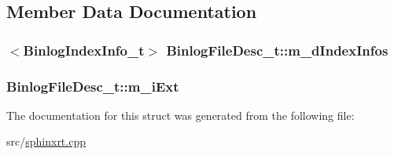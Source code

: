 \subsection{Member Data Documentation}
\hypertarget{structBinlogFileDesc__t_ae59dfebbce348308a6bd2d72e314814c}{
\subsubsection[{m\-\_\-d\-Index\-Infos}]{$<${\bf Binlog\-Index\-Info\-\_\-t}$>$ Binlog\-File\-Desc\-\_\-t\-::m\-\_\-d\-Index\-Infos}}\label{structBinlogFileDesc__t_ae59dfebbce348308a6bd2d72e314814c}
\hypertarget{structBinlogFileDesc__t_a2f95dee71d5a71fa264c0c364b27c643}{
\subsubsection[{m\-\_\-i\-Ext}]{ Binlog\-File\-Desc\-\_\-t\-::m\-\_\-i\-Ext}}\label{structBinlogFileDesc__t_a2f95dee71d5a71fa264c0c364b27c643}


The documentation for this struct was generated from the following file\-:\begin{DoxyCompactItemize}
\item 
src/\hyperlink{sphinxrt_8cpp}{sphinxrt.\-cpp}\end{DoxyCompactItemize}
